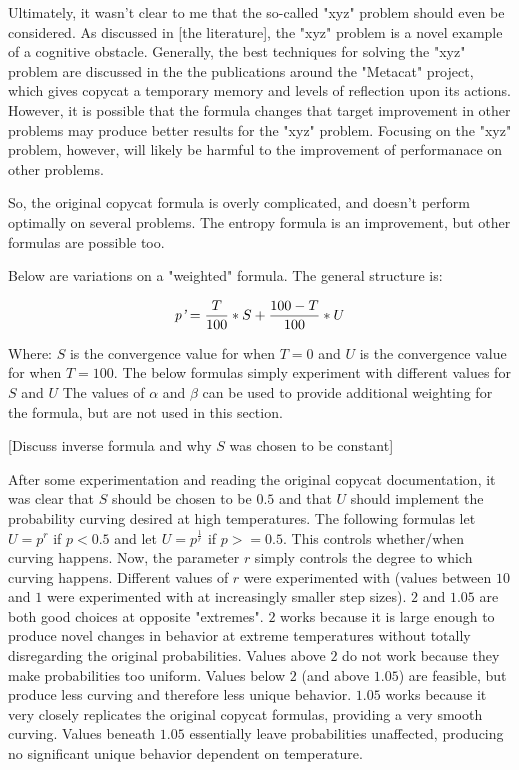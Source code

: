 \documentclass[a4paper]{article}
\begin{document}
            Ultimately, it wasn't clear to me that the so-called "xyz" problem should even be considered.
            As discussed in [the literature], the "xyz" problem is a novel example of a cognitive obstacle. 
            Generally, the best techniques for solving the "xyz" problem are discussed in the the publications around the "Metacat" project, which gives copycat a temporary memory and levels of reflection upon its actions.
            However, it is possible that the formula changes that target improvement in other problems may produce better results for the "xyz" problem.
            Focusing on the "xyz" problem, however, will likely be harmful to the improvement of performanace on other problems.

            So, the original copycat formula is overly complicated, and doesn't perform optimally on several problems.
            The entropy formula is an improvement, but other formulas are possible too.

            Below are variations on a "weighted" formula.
            The general structure is:

            \[\emph{p'} = \frac{T}{100} * S + \frac{100-T}{100} * U\]

            Where: $S$ is the convergence value for when $T = 0$ and
                   $U$ is the convergence value for when $T = 100$.
            The below formulas simply experiment with different values for $S$ and $U$
            The values of $\alpha$ and $\beta$ can be used to provide additional weighting for the formula, but are not used in this section.

            

            [Discuss inverse formula and why $S$ was chosen to be constant]

            After some experimentation and reading the original copycat documentation, it was clear that $S$ should be chosen to be $0.5$ and that $U$ should implement the probability curving desired at high temperatures. 
            The following formulas let $U = p^r$ if $p < 0.5$ and let $U = p^\frac{1}{r}$ if $p >= 0.5$.
            This controls whether/when curving happens.
            Now, the parameter $r$ simply controls the degree to which curving happens.
            Different values of $r$ were experimented with (values between $10$ and $1$ were experimented with at increasingly smaller step sizes).
            $2$ and $1.05$ are both good choices at  opposite "extremes".
            $2$ works because it is large enough to produce novel changes in behavior at extreme temperatures without totally disregarding the original probabilities.
            Values above $2$ do not work because they make probabilities too uniform.
            Values below $2$ (and above $1.05$) are feasible, but produce less curving and therefore less unique behavior.
            $1.05$ works because it very closely replicates the original copycat formulas, providing a very smooth curving.
            Values beneath $1.05$ essentially leave probabilities unaffected, producing no significant unique behavior dependent on temperature.
\end{document}
